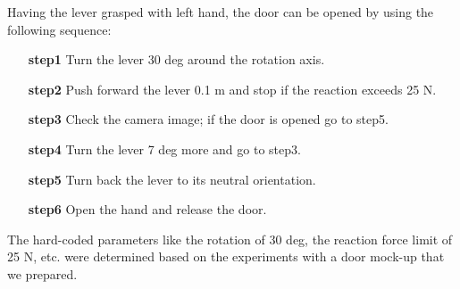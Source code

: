 Having the lever grasped with left hand, the door can be opened by using the following sequence:
%
\begin{itemize}
\item[{\bf step1}] Turn the lever 30 deg around the rotation axis.
\item[{\bf step2}] Push forward the lever 0.1 m and stop if the reaction exceeds 25 N.
\item[{\bf step3}] Check the camera image; if the door is opened go to step5.
\item[{\bf step4}] Turn the lever 7 deg more and go to step3.
\item[{\bf step5}] Turn back the lever to its neutral orientation.
\item[{\bf step6}] Open the hand and release the door. 
\end{itemize}
%
The hard-coded parameters like the rotation of 30 deg, the reaction force limit of 25 N, etc.
were determined based on the experiments with a door mock-up that we prepared.

